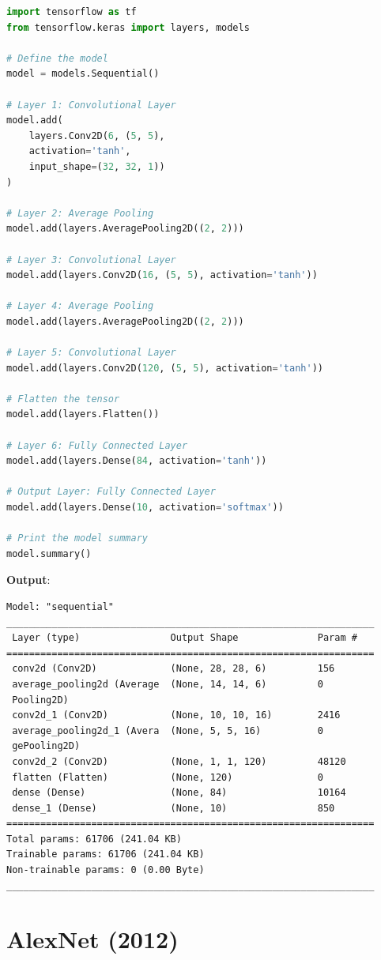 \begin{lstlisting}[language=Python,caption=LeNet - tensorflow - Python]
import tensorflow as tf
from tensorflow.keras import layers, models

# Define the model
model = models.Sequential()

# Layer 1: Convolutional Layer
model.add(
    layers.Conv2D(6, (5, 5), 
    activation='tanh', 
    input_shape=(32, 32, 1))
)

# Layer 2: Average Pooling
model.add(layers.AveragePooling2D((2, 2)))

# Layer 3: Convolutional Layer
model.add(layers.Conv2D(16, (5, 5), activation='tanh'))

# Layer 4: Average Pooling
model.add(layers.AveragePooling2D((2, 2)))

# Layer 5: Convolutional Layer
model.add(layers.Conv2D(120, (5, 5), activation='tanh'))

# Flatten the tensor
model.add(layers.Flatten())

# Layer 6: Fully Connected Layer
model.add(layers.Dense(84, activation='tanh'))

# Output Layer: Fully Connected Layer
model.add(layers.Dense(10, activation='softmax'))

# Print the model summary
model.summary()
\end{lstlisting}

\textbf{Output}:
\begin{lstlisting}[numbers=none]
Model: "sequential"
_________________________________________________________________
 Layer (type)                Output Shape              Param #   
=================================================================
 conv2d (Conv2D)             (None, 28, 28, 6)         156
 average_pooling2d (Average  (None, 14, 14, 6)         0
 Pooling2D)
 conv2d_1 (Conv2D)           (None, 10, 10, 16)        2416
 average_pooling2d_1 (Avera  (None, 5, 5, 16)          0
 gePooling2D)
 conv2d_2 (Conv2D)           (None, 1, 1, 120)         48120
 flatten (Flatten)           (None, 120)               0
 dense (Dense)               (None, 84)                10164
 dense_1 (Dense)             (None, 10)                850
=================================================================
Total params: 61706 (241.04 KB)
Trainable params: 61706 (241.04 KB)
Non-trainable params: 0 (0.00 Byte)
_________________________________________________________________
\end{lstlisting}


\section{AlexNet (2012) \cite{gfg-convolutional-neural-network-cnn-in-machine-learning, medium/@siddheshb008/alexnet-architecture-explained-b6240c528bd5,wiki-AlexNet}}\label{cnn: AlexNet}


